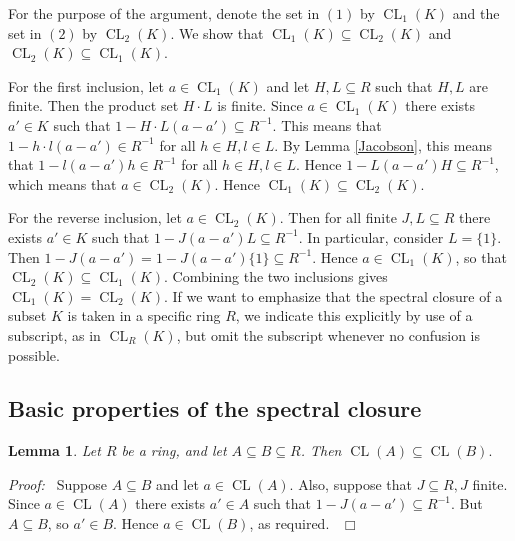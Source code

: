 \documentclass[12pt, oneside]{book}
\newtheorem{lemma}[theorem]{Lemma}
\newcommand{\proof}{{\noindent \it Proof:~}}
\newcommand{\qed}{\hfill ~$\Box$\\}
\def\CL{\operatorname{CL}}
\begin{document}
\noindent For the purpose of the argument, denote the set in $(1)$ by $\CL_1(K)$ 
and the set in $(2)$ by $\CL_2(K)$. We show that $\CL_1(K) \subseteq \CL_2(K)$ and $\CL_2(K) \subseteq \CL_1(K)$. 

\medskip

\noindent For the first inclusion, let $a \in \CL_1(K)$ and let $H,L \subseteq R$ such that 
$H,L$ are finite. 
Then the product set $H \cdot L $ is finite. Since $a \in \CL_1(K)$ there exists $a' \in K$ 
such that $1-H \cdot L (a-a') \subseteq R^{-1}$. This means that $1-h \cdot l (a-a') \in R^{-1}$
 for all $h\in H, l \in L$. By Lemma \ref{Jacobson}, this means that $1- l (a-a')h \in R^{-1}$ 
 for all $h\in H, l \in L$. Hence $1-L(a-a')H \subseteq R^{-1}$, which means that 
 $a \in \CL_2(K)$. Hence $\CL_1(K) \subseteq \CL_2(K).$

\vskip 0.3cm

\noindent For the reverse inclusion, let $a \in \CL_2(K)$. Then for all finite $J,L \subseteq R$
 there exists $a' \in K$ such that $1-J(a-a')L \subseteq R^{-1} $. 
In particular, consider $L=\{1\}$. Then $1-J(a-a')=1-J(a-a')\{1\}\subseteq R^{-1}$. Hence $a \in \CL_1(K)$, so that $\CL_2(K) \subseteq \CL_1(K)$. 
\vskip 0.3cm
\noindent Combining the two inclusions gives $\CL_1(K)=\CL_2(K)$.
\vskip 0.3cm
\noindent If we want to emphasize that the spectral closure of a subset $K$ is taken in a
specific ring $R$, we indicate this explicitly by use of a subscript, as in $\CL_R(K)$, but omit the subscript whenever no confusion is possible.

\subsection{Basic properties of the spectral closure}

\begin{lemma}\label{closureOfSubsets}
\normalfont
Let $R$ be a ring, and let $A \subseteq B \subseteq R$. Then $\CL(A) \subseteq \CL(B).$
\end{lemma}
\proof \space
Suppose $A \subseteq B$ and let $a \in \CL(A).$ Also, suppose that $J \subseteq R, J$ finite. 
Since $a \in \CL(A)$ there exists $a' \in A$ such that $1 - J(a - a') \subseteq R^{-1}.$ 
But $A \subseteq B$, so $a' \in B$. Hence $a \in \CL(B)$, as required. \qed
\end{document}
